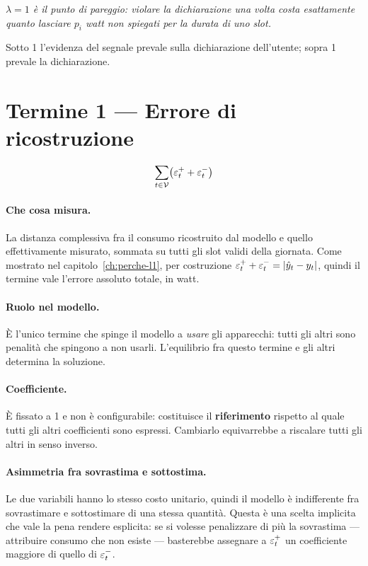 \begin{center}
\begin{minipage}{0.9\textwidth}
\centering\itshape
$\lambda = 1$ è il punto di pareggio: violare la dichiarazione una volta costa esattamente quanto
lasciare $p_i$ watt non spiegati per la durata di uno slot.
\end{minipage}
\end{center}

Sotto 1 l'evidenza del segnale prevale sulla dichiarazione dell'utente; sopra 1 prevale la
dichiarazione.

\section{Termine 1 --- Errore di ricostruzione}

\begin{equation}
  \sum_{t \in \mathcal{V}} \bigl( \varepsilon^{+}_t + \varepsilon^{-}_t \bigr)
\end{equation}

\paragraph{Che cosa misura.} La distanza complessiva fra il consumo ricostruito dal modello e
quello effettivamente misurato, sommata su tutti gli slot validi della giornata. Come mostrato nel
capitolo~\ref{ch:perche-l1}, per costruzione $\varepsilon^{+}_t + \varepsilon^{-}_t = |\hat{y}_t - y_t|$, quindi il termine
vale l'errore assoluto totale, in watt.

\paragraph{Ruolo nel modello.} È l'unico termine che spinge il modello a \emph{usare} gli
apparecchi: tutti gli altri sono penalità che spingono a non usarli. L'equilibrio fra questo
termine e gli altri determina la soluzione.

\paragraph{Coefficiente.} È fissato a 1 e non è configurabile: costituisce il \textbf{riferimento}
rispetto al quale tutti gli altri coefficienti sono espressi. Cambiarlo equivarrebbe a riscalare
tutti gli altri in senso inverso.

\paragraph{Asimmetria fra sovrastima e sottostima.} Le due variabili hanno lo stesso costo
unitario, quindi il modello è indifferente fra sovrastimare e sottostimare di una stessa quantità.
Questa è una scelta implicita che vale la pena rendere esplicita: se si volesse penalizzare di più
la sovrastima --- attribuire consumo che non esiste --- basterebbe assegnare a $\varepsilon^{+}_t$ un
coefficiente maggiore di quello di $\varepsilon^{-}_t$.

